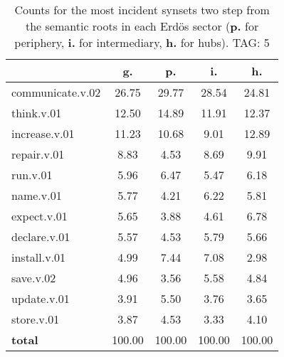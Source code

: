 \begin{table}[h!]
\begin{center}
\begin{tabular}{| l || c | c | c | c |}\hline
 & {\bf g.} & {\bf p.} & {\bf i.} & {\bf h.} \\\hline\hline
communicate.v.02 & 26.75  & 29.77  & 28.54  & 24.81 \\\hline
think.v.01 & 12.50  & 14.89  & 11.91  & 12.37 \\\hline
increase.v.01 & 11.23  & 10.68  & 9.01  & 12.89 \\\hline
repair.v.01 & 8.83  & 4.53  & 8.69  & 9.91 \\\hline
run.v.01 & 5.96  & 6.47  & 5.47  & 6.18 \\\hline
name.v.01 & 5.77  & 4.21  & 6.22  & 5.81 \\\hline
expect.v.01 & 5.65  & 3.88  & 4.61  & 6.78 \\\hline
declare.v.01 & 5.57  & 4.53  & 5.79  & 5.66 \\\hline
install.v.01 & 4.99  & 7.44  & 7.08  & 2.98 \\\hline
save.v.02 & 4.96  & 3.56  & 5.58  & 4.84 \\\hline
update.v.01 & 3.91  & 5.50  & 3.76  & 3.65 \\\hline
store.v.01 & 3.87  & 4.53  & 3.33  & 4.10 \\\hline\hline
{{\bf total}} & 100.00  & 100.00  & 100.00  & 100.00 \\\hline
\end{tabular}
\caption{Counts for the most incident synsets two step from the semantic roots in each Erd\"os sector ({\bf p.} for periphery, {\bf i.} for intermediary, {\bf h.} for hubs). TAG: 5}
\end{center}
\end{table}